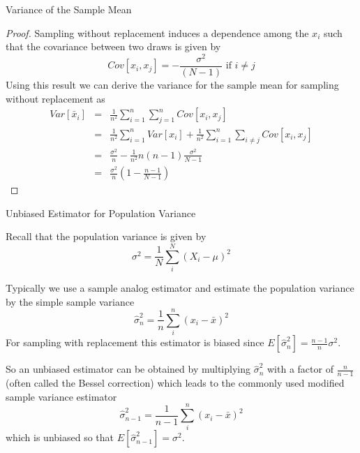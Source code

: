 \documentclass{beamer}
\numberwithin{equation}{section}
\begin{document}
\begin{frame}{Variance of the Sample Mean}
\scriptsize

\begin{proof}

Sampling without replacement induces a dependence among the $x_i$ such that the covariance between two draws is given by
$$
Cov[x_i,x_j]=-\frac{\sigma^2}{(N-1)} \mbox{ if }  i\neq j
$$
Using this result we can derive the variance for the sample mean for sampling without replacement as
\begin{eqnarray}
Var[\bar{x}_i]&=&\frac{1}{n^2} \sum_{i=1}^n \sum_{j=1}^n  Cov[x_i,x_j] \\
  &=& \frac{1}{n^2}     \sum_{i=1}^n Var[x_i] +  \frac{1}{n^2}     \sum_{i=1}^n \sum_{i \neq j}  Cov[x_i,x_j] \\
  &=& \frac{\sigma^2}{n} -  \frac{1}{n^2}  n(n-1) \frac{\sigma^2}{N-1}  \\
  &=&  \frac{\sigma^2}{n} \left(1- \frac{n-1}{N-1} \right) 
\end{eqnarray}
\end{proof}
\end{frame}



\begin{frame}{Unbiased Estimator for Population Variance}
\scriptsize
\begin{theorem}
Recall that the population variance is given by 
$$
\sigma^2 = \frac{1}{N}   \sum_i^N (X_i-\mu)^2
$$

Typically we use a sample analog estimator and estimate the population variance by the simple sample variance $$\hat{\sigma}_n^2 = \frac{1}{n}   \sum_i^n (x_i-\bar{x})^2 $$ For sampling with replacement this estimator is biased since $E[\hat{\sigma}_n^2 ]=\frac{n-1}{n}\sigma^2$.\\\bigskip

So an unbiased estimator can be obtained by multiplying $\hat{\sigma}_n^2$ with a factor of $\frac{n}{n-1}$ (often called the Bessel correction) which leads to the commonly used modified sample variance estimator $$\hat{\sigma}_{n-1}^2 = \frac{1}{n-1}   \sum_i^n (x_i-\bar{x})^2 $$ which is unbiased so that $E[\hat{\sigma}_{n-1}^2 ]=\sigma^2$. 

\end{theorem}

\end{frame}
\end{document}
